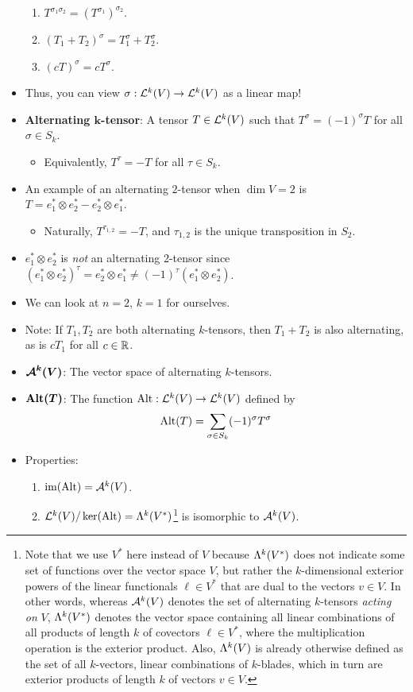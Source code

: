 \documentclass[../notes.tex]{subfiles}
\begin{document}
\begin{itemize}
\begin{enumerate}
        \item $T^{\sigma_1\sigma_2}=(T^{\sigma_1})^{\sigma_2}$.
        \item $(T_1+T_2)^\sigma=T_1^\sigma+T_2^\sigma$.
        \item $(cT)^\sigma=cT^\sigma$.
    \end{enumerate}
    \item Thus, you can view $\sigma:\lin[k]{V}\to\lin[k]{V}$ as a linear map!
    \item \textbf{Alternating $\bm{k}$-tensor}: A tensor $T\in\lin[k]{V}$ such that $T^\sigma=(-1)^\sigma T$ for all $\sigma\in S_k$.
    \begin{itemize}
        \item Equivalently, $T^\tau=-T$ for all $\tau\in S_k$.
    \end{itemize}
    \item An example of an alternating $2$-tensor when $\dim V=2$ is $T=e_1^*\otimes e_2^*-e_2^*\otimes e_1^*$.
    \begin{itemize}
        \item Naturally, $T^{\tau_{1,2}}=-T$, and $\tau_{1,2}$ is the unique transposition in $S_2$.
    \end{itemize}
    \item $e_1^*\otimes e_2^*$ is \emph{not} an alternating 2-tensor since $(e_1^*\otimes e_2^*)^\tau=e_2^*\otimes e_1^*\neq(-1)^\tau(e_1^*\otimes e_2^*)$.
    \item We can look at $n=2$, $k=1$ for ourselves.
    \item Note: If $T_1,T_2$ are both alternating $k$-tensors, then $T_1+T_2$ is also alternating, as is $cT_1$ for all $c\in\R$.
    \item $\bm{\alt[k]{V}}$: The vector space of alternating $k$-tensors.
    \item $\bm{\Alt(T)}$: The function $\Alt:\lin[k]{V}\to\lin[k]{V}$ defined by
    \begin{equation*}
        \Alt(T) = \sum_{\sigma\in S_k}(-1)^\sigma T^\sigma
    \end{equation*}
    \item Properties:
    \begin{enumerate}
        \item $\im(\Alt)=\alt[k]{V}$.
        \item $\lin[k]{V}/\ker(\Alt)=\lam[k]{V^*}$\footnote{Note that we use $V^*$ here instead of $V$ because $\lam[k]{V^*}$ does not indicate some set of functions over the vector space $V$, but rather the $k$-dimensional exterior powers of the linear functionals $\ell\in V^*$ that are dual to the vectors $v\in V$. In other words, whereas $\alt[k]{V}$ denotes the set of alternating $k$-tensors \emph{acting on} $V$, $\lam[k]{V^*}$ denotes the vector space containing all linear combinations of all products of length $k$ of covectors $\ell\in V^*$, where the multiplication operation is the exterior product. Also, $\lam[k]{V}$ is already otherwise defined as the set of all $k$-vectors, linear combinations of $k$-blades, which in turn are exterior products of length $k$ of vectors $v\in V$.} is isomorphic to $\alt[k]{V}$.

\end{enumerate}
\end{itemize}
\end{document}
